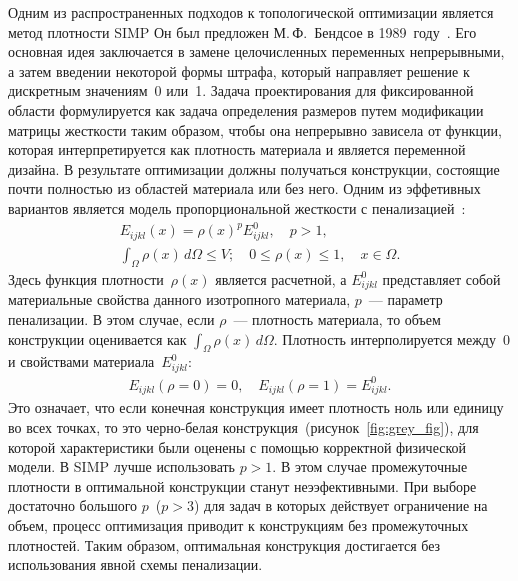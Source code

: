 

Одним из распространенных подходов к топологической оптимизации является метод плотности SIMP
Он был предложен М.\,Ф.~Бендсое в 1989~году~\cite{Bendsoe1989}.
Его основная идея заключается в замене целочисленных переменных непрерывными, а затем введении некоторой формы штрафа, который направляет решение к дискретным значениям~0 или~1. 
Задача проектирования для фиксированной области формулируется как задача определения размеров путем модификации матрицы жесткости таким образом, чтобы она непрерывно зависела от функции, которая интерпретируется как плотность материала и является переменной дизайна.
В результате оптимизации должны получаться конструкции, состоящие почти полностью из областей материала или без него.  
Одним из эффетивных вариантов является модель пропорциональной жесткости с пенализацией~\cite{Bendsoe2003}: 
\begin{equation}\label{eq:simp2} 
	\begin{aligned}
	E_{ijkl}(x) = \rho(x)^p E^0_{ijkl}, \quad p > 1,\\
	\int_{\Omega} \rho(x) \, d\Omega \leq V; \quad 0 \leq \rho(x) \leq 1, \quad x \in \Omega.
	\end{aligned} 
\end{equation}
Здесь функция плотности~$\rho(x)$ является расчетной, а $E_{ijkl}^0$ представляет собой материальные свойства данного изотропного материала, $p$~--- параметр пенализации. В этом случае, если $\rho$~--- плотность материала, то объем конструкции оценивается как $\int_{\Omega} \rho(x) \, d\Omega$.  Плотность интерполируется между~0 и свойствами материала~$E^0_{ijkl}$: 
\begin{equation}\label{eq:simp3} 
 	\begin{aligned}
 		E_{ijkl}(\rho=0) = 0, \quad E_{ijkl}(\rho=1) = E^0_{ijkl}.
 	\end{aligned} 
\end{equation}
Это означает, что если конечная конструкция имеет плотность ноль или единицу во всех точках, то это черно-белая конструкция~(рисунок~\cref{fig:grey_fig}), для которой характеристики были оценены с помощью корректной физической модели. 
В SIMP лучше использовать $p > 1$. В этом случае промежуточные плотности в оптимальной конструкции станут неээфективными. 
При выборе достаточно большого $p$~($p > 3$) для задач в которых действует ограничение на объем, процесс оптимизация приводит к конструкциям без промежуточных плотностей.
Таким образом, оптимальная конструкция достигается без использования явной схемы пенализации. 

